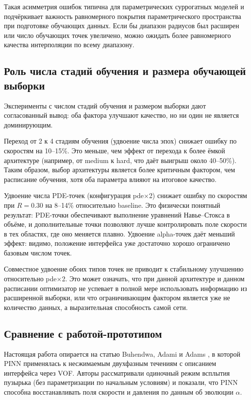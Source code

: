 \documentclass[12pt,a4paper]{article}
\begin{document}
Такая асимметрия ошибок типична для параметрических суррогатных моделей и
подчёркивает важность равномерного покрытия параметрического пространства при
подготовке обучающих данных. Если бы диапазон радиусов был расширен или число
обучающих точек увеличено, можно ожидать более равномерного качества
интерполяции по всему диапазону.

\subsection{Роль числа стадий обучения и размера обучающей выборки}

Эксперименты с числом стадий обучения и размером выборки дают согласованный
вывод: оба фактора улучшают качество, но ни один не является доминирующим.

Переход от 2 к 4 стадиям обучения (удвоение числа эпох) снижает ошибку по
скоростям на 10--15\%. Это меньше, чем эффект от перехода к более ёмкой
архитектуре (например, от medium к hard, что даёт выигрыш около 40--50\%).
Таким образом, выбор архитектуры является более критичным фактором, чем
расписание обучения, хотя оба параметра влияют на итоговое качество.

Удвоение числа PDE-точек (конфигурация pde$\times$2) снижает ошибку по
скоростям при \(R=0.30\) на 8--14\% относительно baseline. Это физически
понятный результат: PDE-точки обеспечивают выполнение уравнений Навье--Стокса
в объёме, и дополнительные точки позволяют лучше контролировать поле скорости в
тех областях, где оно меняется плавно. Удвоение alpha-точек даёт меньший эффект:
видимо, положение интерфейса уже достаточно хорошо ограничено базовым числом
точек.

Совместное удвоение обоих типов точек не приводит к стабильному улучшению
относительно pde$\times$2. Это может означать, что при данной архитектуре и
данном расписании оптимизатор не успевает в полной мере использовать
информацию из расширенной выборки, или что ограничивающим фактором является
уже не количество данных, а выразительная способность самой сети.

\subsection{Сравнение с работой-прототипом}

Настоящая работа опирается на статью Buhendwa, Adami и Adams
\cite{Buhendwa2021}, в которой PINN применялась к несжимаемым двухфазным
течениям с описанием интерфейса через VOF. Авторы рассматривали одиночный
режим всплытия пузырька (без параметризации по начальным условиям) и показали,
что PINN способна восстанавливать поля скорости и давления по данным об
эволюции \(\alpha\).
\end{document}
